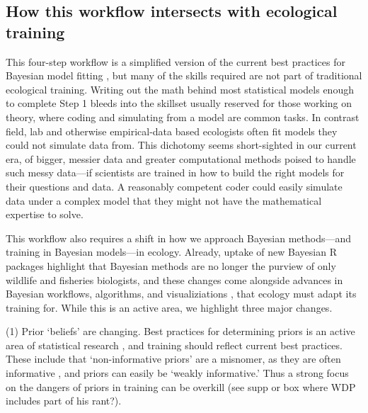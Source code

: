 \documentclass[11pt]{article}
\begin{document}
{\subsection{How this workflow intersects with ecological training} %

This four-step workflow is a simplified version of the current best practices for Bayesian model fitting  \citep{betanworkflow,vandeschoot2021}, but many of the skills required are not part of traditional ecological training. Writing out the math behind most statistical models enough to complete Step 1 bleeds into the skillset usually reserved for those working on theory, where coding and simulating from a model are common tasks. In contrast field, lab and otherwise empirical-data based ecologists often fit models they could not simulate data from. This dichotomy seems short-sighted in our current era, of bigger, messier data and greater computational methods poised to handle such messy data---if scientists are trained in how to build the right models for their questions and data. A reasonably competent coder could easily simulate data under a complex model that they might not have the mathematical expertise to solve. %

This workflow also requires a shift in how we approach Bayesian methods---and training in Bayesian models---in ecology. Already, uptake of new Bayesian \textsf{R} packages highlight that Bayesian methods are no longer the purview of only wildlife and fisheries biologists, and these changes come alongside advances in Bayesian workflows, algorithms, and visualiziations \citep[e.g.][]{betanworkflow,vandeschoot2021,gabryvis}, that ecology must adapt its training for. While this is an active area, we highlight three major changes.

(1) Prior `beliefs' are changing. Best practices for determining priors is an active area of statistical research \citep{BDA,regotherstories}, and training should reflect current best practices. These include that `non-informative priors' are a misnomer, as they are often informative  \citep{lemoine2019}, and priors can easily be `weakly informative.' Thus a strong focus on the dangers of priors in training can be overkill (see supp or box where WDP includes part of his rant?). 

}
\end{document}
